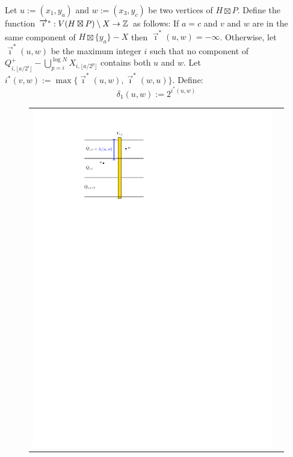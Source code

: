 \documentclass{patmorin}
\begin{document}
Let $u:=(x_1,y_a)$ and $w:=(x_3,y_c)$ be two vertices of $H\boxtimes P$. Define the function $\overrightarrow\imath^*:V(H\boxtimes P)\setminus X\to\mathbb{Z}$ as follows:
If $a=c$ and $v$ and $w$ are in the same component of $H\boxtimes\{y_a\}-X$ then $\overrightarrow\imath^*(u,w)=-\infty$.  Otherwise, let $\overrightarrow\imath^*(u,w)$ be the maximum integer $i$ such that no component of $Q^+_{i,\lfloor a/2^i\rfloor}-\bigcup_{p=i}^{\log N} X_{i,\lfloor a/2^p\rfloor}$ contains both $u$ and $w$. Let $i^*(v,w):=\max\{\overrightarrow\imath^*(u,w),\overrightarrow\imath^*(w,u)\}$. Define:
\[
  \delta_1(u,w):=2^{i^*(u,w)}
\]

\begin{figure}
    \centering
    \begin{tabular}{cc}
    \includegraphics[page=1]{figs/new_metric} &

\end{tabular}
\end{figure}
\end{document}
